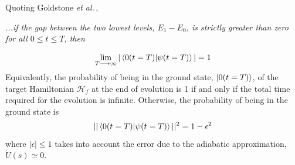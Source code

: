 \newpage
Quoting Goldstone \textit{et al.}\,\cite{Farhi2000QuantumEvolution},
\begin{displayquote}
\textit{...if the gap between the two lowest levels, $E_{1} - E_{0}$, is strictly greater than zero for all $0 \leq t \leq T$, then}
\end{displayquote}
\begin{equation}
    \lim_{T\longrightarrow \infty} | \braket{0(t=T) | \psi(t=T)}| = 1
\end{equation}
Equivalently, the probability of being in the ground state, $\ket{0(t=T)}$, of the target Hamiltonian $\mathcal{H}_{f}$ at the end of evolution is 1 if and only if the total time required for the evolution is infinite. Otherwise, the probability of being in the ground state is
\begin{equation}
    || \braket{0(t=T) | \psi(t=T)}||^{2} = 1 - \epsilon^{2}
\end{equation}
where $|\epsilon| \leq 1$ takes into account the error due to the adiabatic approximation, $\dot{U}(s) \simeq 0$.
